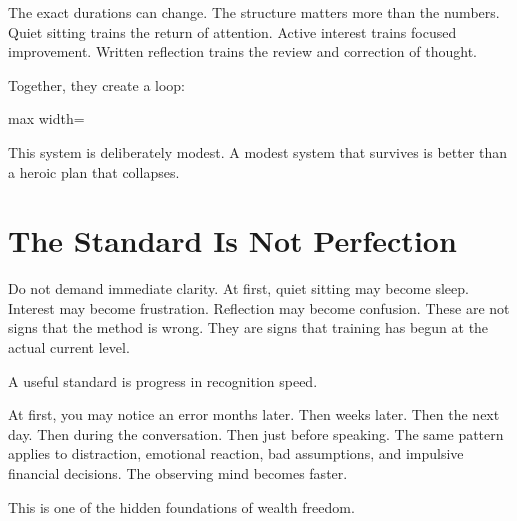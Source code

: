 The exact durations can change. The structure matters more than the numbers. Quiet sitting trains the return of attention. Active interest trains focused improvement. Written reflection trains the review and correction of thought.

Together, they create a loop:

\begin{center}
\begin{adjustbox}{max width=\linewidth}
\end{adjustbox}
\end{center}

This system is deliberately modest. A modest system that survives is better than a heroic plan that collapses.

\section*{The Standard Is Not Perfection}

Do not demand immediate clarity. At first, quiet sitting may become sleep. Interest may become frustration. Reflection may become confusion. These are not signs that the method is wrong. They are signs that training has begun at the actual current level.

A useful standard is progress in recognition speed.

At first, you may notice an error months later. Then weeks later. Then the next day. Then during the conversation. Then just before speaking. The same pattern applies to distraction, emotional reaction, bad assumptions, and impulsive financial decisions. The observing mind becomes faster.

This is one of the hidden foundations of wealth freedom.

